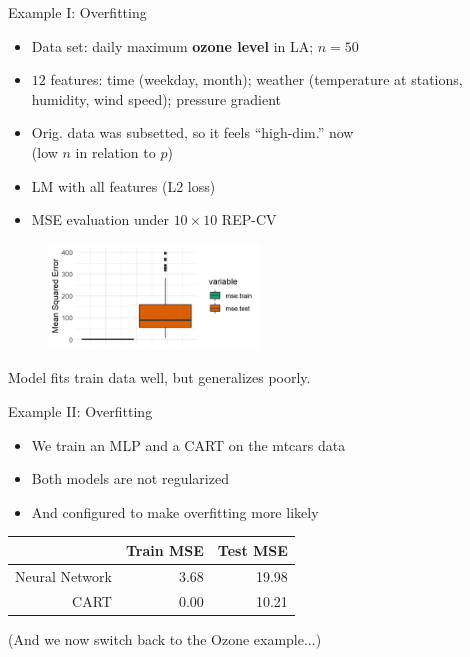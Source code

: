 \documentclass[11pt,compress,t,notes=noshow, xcolor=table]{beamer}
\begin{document}
\begin{vbframe}{Example I: Overfitting}

\begin{itemize}
\item Data set: daily maximum \textbf{ozone level} in LA; $n = 50$
\item $12$ features: time (weekday, month); weather (temperature at stations, humidity, wind speed); pressure gradient
\item Orig. data was subsetted, so it feels \enquote{high-dim.} now \\
(low $n$ in relation to $p$)

\item LM with all features (L2 loss)


\item MSE evaluation under $10 \times 10$ REP-CV

\end{itemize}

\begin{figure}
\includegraphics[width=0.5\textwidth]{figure/ozone_mse_boxplot.png}\\
\end{figure}

Model fits train data well, but generalizes poorly.

\end{vbframe}

\begin{vbframe}{Example II: Overfitting}

\begin{itemize}
 \item We train an MLP and a CART on the mtcars data
\item Both models are not regularized
\item And configured to make overfitting more likely
\end{itemize}

\lz \lz

\begin{table}[ht]
\centering
\begin{tabular}{rrr}
  \hline
 & Train MSE & Test MSE \\ 
  \hline
Neural Network & 3.68 & 19.98 \\ 
  CART & 0.00 & 10.21 \\ 
   \hline
\end{tabular}
\end{table}

\lz \lz

(And we now switch back to the Ozone example...)

\end{vbframe}
\end{document}
